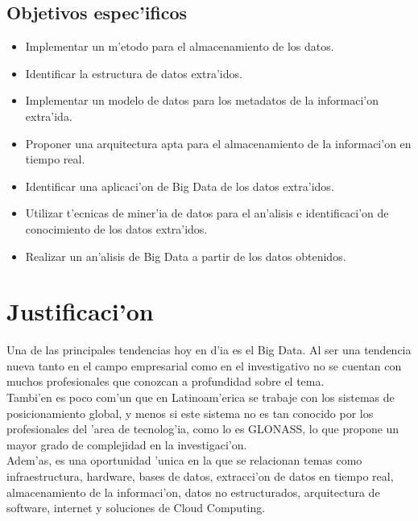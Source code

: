\subsection{Objetivos espec'ificos}
\noindent
\begin{itemize}
\item Implementar un m'etodo para el almacenamiento de los datos.

\item Identificar la estructura de datos extra'idos.

\item Implementar un modelo de datos para los metadatos de la informaci'on extra'ida.

\item Proponer una arquitectura apta para el almacenamiento de la informaci'on en tiempo real.

\item Identificar una aplicaci'on de Big Data de los datos extra'idos.

\item Utilizar t'ecnicas de miner'ia de datos para el an'alisis e identificaci'on de conocimiento de los datos extra'idos.

\item Realizar un an'alisis de Big Data a partir de los datos obtenidos.
\end{itemize}

\section{Justificaci'on}
\noindent
Una de las principales tendencias hoy en d'ia es el Big Data. Al ser una tendencia nueva tanto en el campo empresarial como en el investigativo no se cuentan con muchos profesionales que conozcan a profundidad sobre el tema.\\

Tambi'en es poco com'un que en Latinoam'erica se trabaje con los sistemas de posicionamiento global, y menos si este sistema no es tan conocido por los profesionales del 'area de tecnolog'ia, como lo es GLONASS, lo que propone un mayor grado de complejidad en la investigaci'on.\\

Adem'as, es una oportunidad 'unica en la que se relacionan temas como infraestructura, hardware, bases de datos, extracci'on de datos en tiempo real, almacenamiento de la informaci'on, datos no estructurados, arquitectura de software, internet y soluciones de Cloud Computing.\\

